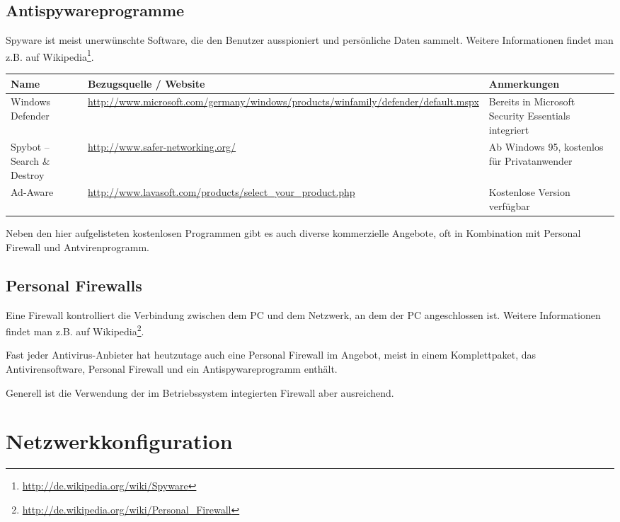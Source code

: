 \documentclass[a4paper,12pt,draft]{scrartcl}
\begin{document}
\subsection*{Antispywareprogramme}

Spyware ist meist unerwünschte Software, die den Benutzer ausspioniert und persönliche Daten sammelt. Weitere Informationen findet man z.B. auf Wikipedia\footnote{\url{http://de.wikipedia.org/wiki/Spyware}}.

\begin{center}
  \begin{tabularx}{\linewidth}{|p{.18\linewidth}Xp{.3\linewidth}|}
    \hline
    Name & Bezugsquelle / Website & Anmerkungen\\
    \hline \hline
    Windows Defender & \url{http://www.microsoft.com/germany/windows/products/winfamily/defender/default.mspx} & Bereits in Microsoft Security Essentials integriert\\
    \hline
    Spybot – Search \& Destroy & \url{http://www.safer-networking.org/} & Ab Windows 95, kostenlos für Privatanwender\\
    \hline
    Ad-Aware & \url{http://www.lavasoft.com/products/select\_your\_product.php} & Kostenlose Version verfügbar\\
    \hline
  \end{tabularx}
\end{center}

Neben den hier aufgelisteten kostenlosen Programmen gibt es auch diverse kommerzielle Angebote, oft in Kombination mit Personal Firewall und Antvirenprogramm.

\subsection*{Personal Firewalls}

Eine Firewall kontrolliert die Verbindung zwischen dem PC und dem Netzwerk, an dem der PC angeschlossen ist. Weitere Informationen findet man z.B. auf Wikipedia\footnote{\url{http://de.wikipedia.org/wiki/Personal\_Firewall}}.

Fast jeder Antivirus-Anbieter hat heutzutage auch eine Personal Firewall im Angebot, meist in einem Komplettpaket, das Antivirensoftware, Personal Firewall und ein Antispywareprogramm enthält.

Generell ist die Verwendung der im Betriebssystem integierten Firewall aber ausreichend.

\newpage

\section*{Netzwerkkonfiguration}
\end{document}
